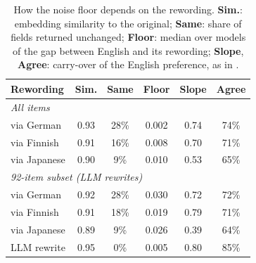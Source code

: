 \begin{table}[t]
\centering
\small
\setlength{\tabcolsep}{3.2pt}
\begin{tabular}{lccccc}
\toprule
\textbf{Rewording} & \textbf{Sim.} & \textbf{Same} & \textbf{Floor} & \textbf{Slope} & \textbf{Agree} \\
\midrule
\multicolumn{6}{l}{\emph{All items}} \\
via German & 0.93 & 28\% & 0.002 & 0.74 & 74\% \\
via Finnish & 0.91 & 16\% & 0.008 & 0.70 & 71\% \\
via Japanese & 0.90 & 9\% & 0.010 & 0.53 & 65\% \\
\multicolumn{6}{l}{\emph{92-item subset (LLM rewrites)}} \\
via German & 0.92 & 28\% & 0.030 & 0.72 & 72\% \\
via Finnish & 0.91 & 18\% & 0.019 & 0.79 & 71\% \\
via Japanese & 0.89 & 9\% & 0.026 & 0.39 & 64\% \\
LLM rewrite & 0.95 & 0\% & 0.005 & 0.80 & 85\% \\
\bottomrule
\end{tabular}
\caption{How the noise floor depends on the rewording. \textbf{Sim.}: embedding similarity to the original; \textbf{Same}: share of fields returned unchanged; \textbf{Floor}: median over models of the gap between English and its rewording; \textbf{Slope}, \textbf{Agree}: carry-over of the English preference, as in .}
\label{tab:floor}
\end{table}
